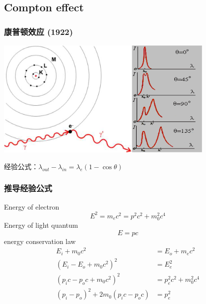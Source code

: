 \subsection{Compton effect}

\begin{frame}   
    \frametitle{康普顿效应 (1922)}
    \begin{center}
        \includegraphics[width=0.8\textwidth]{figs/compton.png}
    \end{center}  
    经验公式：$\lambda_{out}-\lambda_{in}=\lambda_e(1-\cos \theta)$
\end{frame}

\begin{frame}  
    \frametitle{推导经验公式} 
    Energy of electron 
    \begin{equation*}
        E^2 =m_ec^2=p^2c^2 +m_0 ^2 c^4 
    \end{equation*}
    Energy of light quantum
    \begin{equation*}
        E =pc 
    \end{equation*}
    energy conservation law
    \begin{equation*}
        \begin{split}
        E_i + m_0 c^2 &= E_o + m_ec^2 \\
        (E_i -E_o + m_0 c^2)^2 &= E_e ^2\\
        (p_i c-p_o c + m_0 c^2) ^2 &= p_e ^2 c^2 +m_0 ^2 c^4 \\
        (p_i-p_o)^2 +2 m_0 (p_i c-p_o c) &= p_e ^2
    \end{split}
    \end{equation*}
\end{frame}


